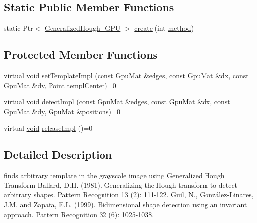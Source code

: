 \subsection*{Static Public Member Functions}
\begin{DoxyCompactItemize}
\item 
static Ptr$<$ \hyperlink{classcv_1_1gpu_1_1GeneralizedHough__GPU}{Generalized\-Hough\-\_\-\-G\-P\-U} $>$ \hyperlink{classcv_1_1gpu_1_1GeneralizedHough__GPU_a83bd35fb695725af558920556e38ea02}{create} (int \hyperlink{legacy_8hpp_adc6d8f8df4f2d0df2ece83c432e2681f}{method})
\end{DoxyCompactItemize}
\subsection*{Protected Member Functions}
\begin{DoxyCompactItemize}
\item 
virtual \hyperlink{legacy_8hpp_a8bb47f092d473522721002c86c13b94e}{void} \hyperlink{classcv_1_1gpu_1_1GeneralizedHough__GPU_adb8d3c0195b6987debac862d99c2b8e6}{set\-Template\-Impl} (const Gpu\-Mat \&\hyperlink{imgproc__c_8h_a0934986249e7ba69309a154af3260f89}{edges}, const Gpu\-Mat \&dx, const Gpu\-Mat \&dy, Point templ\-Center)=0
\item 
virtual \hyperlink{legacy_8hpp_a8bb47f092d473522721002c86c13b94e}{void} \hyperlink{classcv_1_1gpu_1_1GeneralizedHough__GPU_aa0a457ed96ff8ca8f79dbb675987bc5e}{detect\-Impl} (const Gpu\-Mat \&\hyperlink{imgproc__c_8h_a0934986249e7ba69309a154af3260f89}{edges}, const Gpu\-Mat \&dx, const Gpu\-Mat \&dy, Gpu\-Mat \&positions)=0
\item 
virtual \hyperlink{legacy_8hpp_a8bb47f092d473522721002c86c13b94e}{void} \hyperlink{classcv_1_1gpu_1_1GeneralizedHough__GPU_a2de38df041a2da5493e042946505262b}{release\-Impl} ()=0
\end{DoxyCompactItemize}


\subsection{Detailed Description}
finds arbitrary template in the grayscale image using Generalized Hough Transform Ballard, D.\-H. (1981). Generalizing the Hough transform to detect arbitrary shapes. Pattern Recognition 13 (2)\-: 111-\/122. Guil, N., González-\/\-Linares, J.\-M. and Zapata, E.\-L. (1999). Bidimensional shape detection using an invariant approach. Pattern Recognition 32 (6)\-: 1025-\/1038. 

